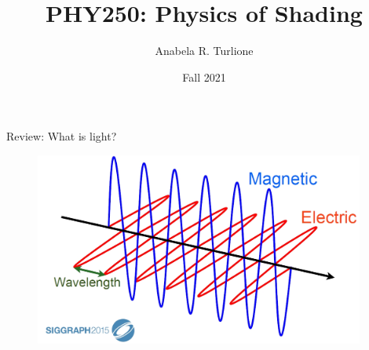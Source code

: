 \documentclass[]{beamer}
\title{PHY250: Physics of Shading}    %
\author{Anabela R. Turlione}                 %
\institute{Digipen}      %
\date{Fall 2021}                    %
\begin{document}
\begin{frame}
  \titlepage
\end{frame}

\section[]{}





 \setcounter{example}{1} 





 \begin{frame}


  \textcolor{mypink1}{Review: What is light?}
  \begin{figure}[h!]
    \begin{center}
      \includegraphics[height=2.5in]{images/1.jpg}
    \end{center}
  \end{figure}
\end{frame}
  
\end{document}
